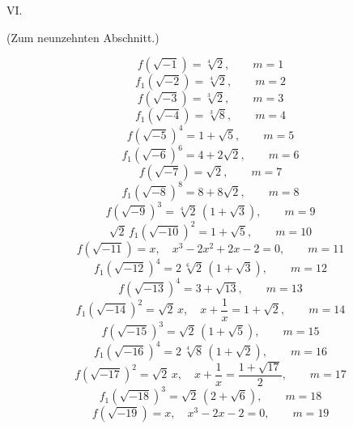 
\begin{center}
 VI.


(Zum neunzehnten Abschnitt.)
\end{center}

\[ f(\sqrt{-1}) = \sqrt[4]{2}, \qquad m = 1 \]
\[ f_1(\sqrt{-2}) = \sqrt[4]{2}, \qquad m = 2 \]
\[ f(\sqrt{-3}) = \sqrt[3]{2}, \qquad m = 3 \]
\[ f_1(\sqrt{-4}) = \sqrt[3]{8}, \qquad m = 4 \]
\[ f(\sqrt{-5})^4 = 1 + \sqrt5, \qquad m = 5 \]
\[ f_1(\sqrt{-6})^6 = 4 + 2\sqrt2, \qquad m = 6 \]
\[ f(\sqrt{-7}) = \sqrt2, \qquad m = 7 \]
\[ f_1(\sqrt{-8})^8 = 8 + 8\sqrt2, \qquad m = 8 \]
\[ f(\sqrt{-9})^3 = \sqrt[4]{2}\,(1+\sqrt3), \qquad m = 9 \]
\[ \sqrt2\,f_1(\sqrt{-10})^2 = 1 + \sqrt5, \qquad m = 10 \]
\[ f(\sqrt{-11}) = x, \quad x^3 - 2x^2 + 2x - 2 = 0, \qquad m = 11 \]
\[ f_1(\sqrt{-12})^4 = 2\,\sqrt[6]{2}\,(1+\sqrt3), \qquad m = 12 \]
\[ f(\sqrt{-13})^4 = 3 + \sqrt{13}, \qquad m = 13 \]
\[ f_1(\sqrt{-14})^2 = \sqrt2\,x, \quad x + \frac{1}{x} = 1 + \sqrt2, \qquad m = 14 \]
\[ f(\sqrt{-15})^3 = \sqrt2\,(1+\sqrt5), \qquad m = 15 \]
\[ f_1(\sqrt{-16})^4 = 2\,\sqrt[4]{8}\,(1+\sqrt2), \qquad m = 16 \]
\[ f(\sqrt{-17})^2 = \sqrt2\,x, \quad x + \frac{1}{x} = \frac{1+\sqrt{17}}{2}, \qquad m = 17 \]
\[ f_1(\sqrt{-18})^3 = \sqrt2\,(2+\sqrt6), \qquad m = 18 \]
\[ f(\sqrt{-19}) = x, \quad x^3 - 2x - 2 = 0, \qquad m = 19 \]
